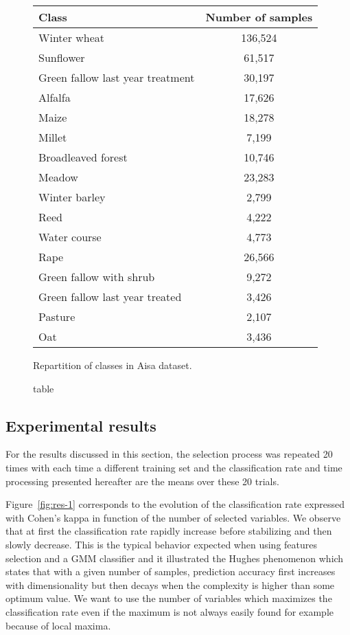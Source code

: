 \documentclass[a4paper,11pt,DIV=16,abstracton]{scrartcl}
\begin{document}
    \begin{figure}[!ht]
        \centering
        \begin{tabular}[b]{lc}\hline
          Class & Number of samples \\ \hline
          Winter wheat & 136,524 \\
          Sunflower & 61,517 \\
          Green fallow last year treatment & 30,197 \\
          Alfalfa & 17,626 \\
          Maize & 18,278 \\
          Millet & 7,199 \\
          Broadleaved forest & 10,746 \\
          Meadow & 23,283 \\
          Winter barley & 2,799 \\
          Reed & 4,222 \\
          Water course & 4,773 \\
          Rape & 26,566 \\
          Green fallow with shrub & 9,272 \\
          Green fallow last year treated & 3,426 \\
          Pasture & 2,107 \\
          Oat & 3,436 \\ \hline
        \end{tabular}
        \caption{table}{Repartition of classes in Aisa dataset.\label{tab:aisa}}
    \end{figure}

    \subsection{Experimental results}

    For the results discussed in this section, the selection process was repeated 20 times with each time a different training set and the classification rate and time processing presented hereafter are the means over these 20 trials.

    Figure~\ref{fig:res-1} corresponds to the evolution of the classification rate expressed with Cohen's kappa in function of the number of selected variables. We observe that at first the classification rate rapidly increase before stabilizing and then slowly decrease. This is the typical behavior expected when using features selection and a GMM classifier and it illustrated the Hughes phenomenon \cite{hughes1968mean} which states that with a given number of samples, prediction accuracy first increases with dimensionality but then decays when the complexity is higher than some optimum value. We want to use the number of variables which maximizes the classification rate even if the maximum is not always easily found for example because of local maxima.
\end{document}
